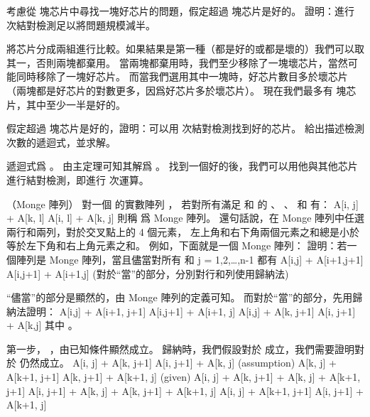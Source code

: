 \item 考慮從  塊芯片中尋找一塊好芯片的問題，假定超過  塊芯片是好的。
證明：進行  次結對檢測足以將問題規模減半。

\startANSWER
將芯片分成兩組進行比較。如果結果是第一種（都是好的或都是壞的）我們可以取其一，否則兩塊都棄用。
當兩塊都棄用時，我們至少移除了一塊壞芯片，當然可能同時移除了一塊好芯片。
而當我們選用其中一塊時，好芯片數目多於壞芯片（兩塊都是好芯片的對數更多，因爲好芯片多於壞芯片）。
現在我們最多有  塊芯片，其中至少一半是好的。
\stopANSWER

\item 假定超過  塊芯片是好的，證明：可以用  次結對檢測找到好的芯片。
給出描述檢測次數的遞迴式，並求解。

\startANSWER
遞迴式爲 。
由主定理可知其解爲 。
找到一個好的後，我們可以用他與其他芯片進行結對檢測，即進行  次運算。
\stopANSWER

\stopigBase
\stopPROBLEM

\startPROBLEM（Monge 陣列）
對一個  的實數陣列 ，
若對所有滿足  和  的 、 、  和  有：
\startformula
A[i, j] + A[k, l] \le A[i, l] + A[k, j]
\stopformula
則稱  爲 {\EMP Monge 陣列}。
還句話說，在 Monge 陣列中任選兩行和兩列，對於交叉點上的 4 個元素，
左上角和右下角兩個元素之和總是小於等於左下角和右上角元素之和。
例如，下面就是一個 Monge 陣列：
\startformula\startmatrix
{}     \NR
{}     \NR
{}     \NR
{}     \NR
{}     \NR
{}     \NR
{}     \NR
\stopmatrix\stopformula
\startigBase[a]
\startitem 證明：若一個陣列是 Monge 陣列，當且儘當對所有  和 {j = 1,2,\ldots,n-1} 都有
\startformula
A[i,j] + A[i+1,j+1] \le A[i,j+1] + A[i+1,j]
\stopformula
(\hint 對於“當”的部分，分別對行和列使用歸納法)
\stopitem

\startANSWER
“儘當”的部分是顯然的，由 Monge 陣列的定義可知。
而對於“當”的部分，先用歸納法證明：
\startformula\startmathalignment[n=1]
\NC A[i,j] + A[i+1, j+1] \le A[i,j+1] + A[i+1, j] \NR
\NC \Downarrow \NR
\NC A[i,j] + A[k, j+1] \le A[i, j+1] + A[k,j] \NR
\stopmathalignment\stopformula
其中 。

第一步， ，由已知條件顯然成立。
歸納時，我們假設對於  成立，我們需要證明對於  仍然成立。
\startformula\startmathalignment[n=1]
\NC A[i, j] + A[k, j+1] \le A[i, j+1] + A[k, j] \quad (assumption) \NR
\NC A[k, j] + A[k+1, j+1] \le A[k, j+1] + A[k+1, j] \quad (given) \NR
\NC \Downarrow \NR
\NC A[i, j] + A[k, j+1] + A[k, j] + A[k+1, j+1] \le A[i, j+1] + A[k, j] + A[k, j+1] + A[k+1, j] \NR
\NC \Downarrow \NR
\NC A[i, j] + A[k+1, j+1] \le A[i, j+1] + A[k+1, j] \NR
\stopmathalignment\stopformula
\stopANSWER

